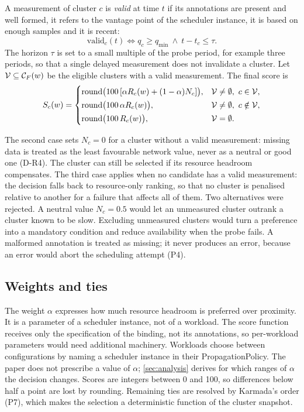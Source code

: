 A measurement of cluster $c$ is \emph{valid} at time $t$ if its annotations are present and well formed, it refers to the vantage point of the scheduler instance, it is based on enough samples and it is recent:
\begin{equation}\label{eq:valid}
  \mathrm{valid}_c(t) \iff q_c \geq q_{\min} \ \wedge\ t - t_c \leq \tau .
\end{equation}
The horizon $\tau$ is set to a small multiple of the probe period, for example three periods, so that a single delayed measurement does not invalidate a cluster. Let $\mathcal{V} \subseteq \mathcal{C}_{F}(w)$ be the eligible clusters with a valid measurement. The final score is
\begin{equation}\label{eq:score}
  S_c(w) =
  \begin{cases}
    \operatorname{round}\!\big(100\,[\alpha R_c(w) + (1-\alpha) N_c]\big), & \mathcal{V} \neq \emptyset,\ c \in \mathcal{V},\\[2pt]
    \operatorname{round}\!\big(100\,\alpha R_c(w)\big), & \mathcal{V} \neq \emptyset,\ c \notin \mathcal{V},\\[2pt]
    \operatorname{round}\!\big(100\, R_c(w)\big), & \mathcal{V} = \emptyset .
  \end{cases}
\end{equation}

The second case sets $N_c = 0$ for a cluster without a valid measurement: missing data is treated as the least favourable network value, never as a neutral or good one (D-R4). The cluster can still be selected if its resource headroom compensates. The third case applies when no candidate has a valid measurement: the decision falls back to resource-only ranking, so that no cluster is penalised relative to another for a failure that affects all of them. Two alternatives were rejected. A neutral value $N_c = 0.5$ would let an unmeasured cluster outrank a cluster known to be slow. Excluding unmeasured clusters would turn a preference into a mandatory condition and reduce availability when the probe fails. A malformed annotation is treated as missing; it never produces an error, because an error would abort the scheduling attempt (P4).

\subsection{Weights and ties}\label{sec:method-weights}

The weight $\alpha$ expresses how much resource headroom is preferred over proximity. It is a parameter of a scheduler instance, not of a workload. The score function receives only the specification of the binding, not its annotations, so per-workload parameters would need additional machinery. Workloads choose between configurations by naming a scheduler instance in their PropagationPolicy. The paper does not prescribe a value of $\alpha$; \cref{sec:analysis} derives for which ranges of $\alpha$ the decision changes. Scores are integers between 0 and 100, so differences below half a point are lost by rounding. Remaining ties are resolved by Karmada's order (P7), which makes the selection a deterministic function of the cluster snapshot.
